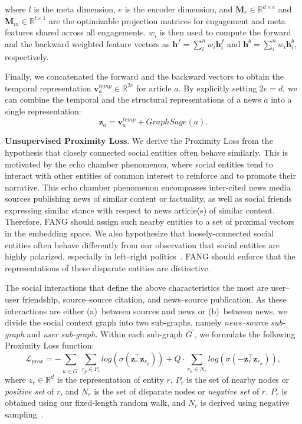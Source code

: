 \documentclass[sigconf]{acmart}
\theoremstyle{definition}
\theoremstyle{hypothesis}
\begin{document}
\noindent where $l$ is the meta dimension, $e$ is the encoder dimension, and $\mathbf{M}_e\in \mathbb{R}^{d\times e}$ and $\mathbf{M}_m\in \mathbb{R}^{l\times 1}$ are the optimizable projection matrices for engagement and meta features shared across all engagements. $w_i$ is then used to compute the forward and the backward weighted feature vectors as $\boldsymbol{h}^f=\sum^n_i w_i \boldsymbol{h}^f_i$ and $\boldsymbol{h}^b=\sum^n_i w_i \boldsymbol{h}^b_i$, respectively.

Finally, we concatenated the forward and the backward vectors to obtain the temporal representation $\boldsymbol{v}^{temp}_{a}\in\mathbb{R}^{2e}$ for article $a$. By explicitly setting $2e=d$, we can combine the temporal and the structural representations of a news $a$ into a single representation: 
\begin{equation}\label{eq:news_rep}
    \boldsymbol{z}_a=\boldsymbol{v}^{temp}_{a} + GraphSage(a).     
\end{equation}

\textbf{Unsupervised Proximity Loss}. We derive the Proximity Loss from the hypothesis that closely connected social entities often behave similarly. This is motivated by the echo chamber phenomenon, where social entities tend to interact with other entities of common interest to reinforce and to promote their narrative. This echo chamber phenomenon encompasses inter-cited news media sources publishing news of similar content or factuality, as well as social friends expressing similar stance with respect to news article(s) of similar content. Therefore, FANG should assign such nearby entities to a set of proximal vectors in the embedding space. We also hypothesize that loosely-connected social entities often behave differently from our observation that social entities are highly polarized, especially in left--right politics~\cite{boxell2017internet}. FANG should enforce that the representations of these disparate entities are distinctive.

The social interactions that define the above characteristics the most are user--user friendship, source--source citation, and news--source publication. As these interactions are either (a)~between sources and news or (b)~between news, we divide the social context graph into two sub-graphs, namely \emph{news--source sub-graph} and \emph{user sub-graph}. 
Within each sub-graph $G^{\prime}$, we formulate the following Proximity Loss function:
\begin{equation}\label{eq:proximity_loss}
    \mathcal{L}_{prox} =  - \sum_{u\in G^{\prime}} \sum_{r_p\in P_r} log(\sigma(\boldsymbol{z}_r^\top \boldsymbol{z}_{r_p})) + Q \cdot \sum_{r_n\in N_r} log(\sigma(-\boldsymbol{z}_r^\top \boldsymbol{z}_{r_n})), 
\end{equation}
where $z_r\in \mathbb{R}^d$ is the representation of entity $r$, $P_r$ is the set of nearby nodes or \textit{positive set} of $r$, and $N_r$ is the set of disparate nodes or \textit{negative set} of $r$.
$P_{r}$ is obtained using our fixed-length
random walk, and $N_{r}$ is derived using negative sampling~\cite{Hamilton2017InductiveRL}. 
\end{document}
